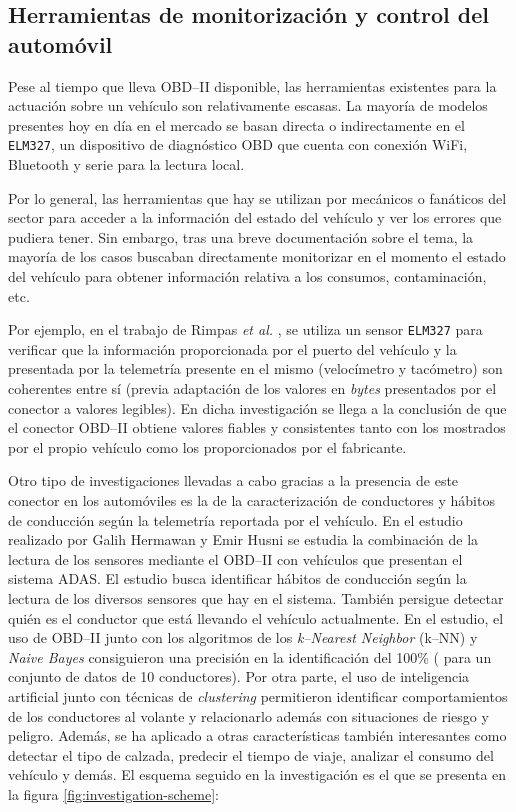\subsection{Herramientas de monitorización y control del automóvil}
Pese al tiempo que lleva \ac{OBD}--II disponible, las herramientas existentes para
la actuación sobre un vehículo son relativamente escasas. La mayoría de modelos
presentes hoy en día en el mercado se basan directa o indirectamente en el
\texttt{ELM327}, un dispositivo de diagnóstico \ac{OBD} que cuenta con conexión
WiFi, Bluetooth y serie para la lectura local.

Por lo general, las herramientas que hay se utilizan por mecánicos o fanáticos del
sector para acceder a la información del estado del vehículo y ver los errores que
pudiera tener. Sin embargo, tras una breve documentación sobre el tema, la mayoría
de los casos buscaban directamente monitorizar en el momento el estado
del vehículo para obtener información relativa a los consumos, contaminación,
etc.

Por ejemplo, en el trabajo de Rimpas \textit{et al.} \cite{rimpasOBDIISensorDiagnostics2020}, se utiliza
un sensor \texttt{ELM327} para verificar que la información proporcionada por
el puerto del vehículo y la presentada por la telemetría presente en el mismo
(velocímetro y tacómetro) son coherentes entre sí (previa adaptación de los
valores en \textit{bytes} presentados por el conector a valores legibles). En
dicha investigación se llega a la conclusión de que el conector \ac{OBD}--II obtiene
valores fiables y consistentes tanto con los mostrados por el propio vehículo
como los proporcionados por el fabricante.

Otro tipo de investigaciones llevadas a cabo gracias a la presencia de este conector
en los automóviles es la de la caracterización de conductores y hábitos de conducción
según la telemetría reportada por el vehículo. En el estudio realizado por
Galih Hermawan y Emir Husni \cite{hermawanAcquisitionModelingEvaluating2020} se
estudia la combinación de la lectura de los sensores mediante el \ac{OBD}--II con
vehículos que presentan el sistema \ac{ADAS}.
El estudio busca identificar hábitos de conducción según la lectura de los diversos
sensores que hay en el sistema. También persigue detectar quién es el conductor que
está llevando el vehículo actualmente. En el estudio, el uso de \ac{OBD}--II junto
con los algoritmos de los \textit{k--Nearest Neighbor} (k--NN) y \textit{Naive Bayes}
consiguieron una precisión en la identificación del 100\% (
para un conjunto de datos de 10 conductores).
Por otra parte, el uso de inteligencia artificial junto con técnicas de \textit{clustering}
permitieron identificar comportamientos de los conductores al volante y relacionarlo
además con situaciones de riesgo y peligro. Además, se ha aplicado a otras características
también interesantes como detectar el tipo de calzada, predecir el tiempo de viaje,
analizar el consumo del vehículo y demás. El esquema seguido en la investigación es el
que se presenta en la figura \ref{fig:investigation-scheme}:

